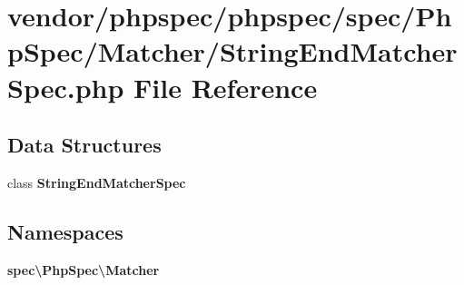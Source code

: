 \section{vendor/phpspec/phpspec/spec/\+Php\+Spec/\+Matcher/\+String\+End\+Matcher\+Spec.php File Reference}
\label{_string_end_matcher_spec_8php}
\subsection*{Data Structures}
\begin{DoxyCompactItemize}
\item 
class {\bf String\+End\+Matcher\+Spec}
\end{DoxyCompactItemize}
\subsection*{Namespaces}
\begin{DoxyCompactItemize}
\item 
 {\bf spec\textbackslash{}\+Php\+Spec\textbackslash{}\+Matcher}
\end{DoxyCompactItemize}
